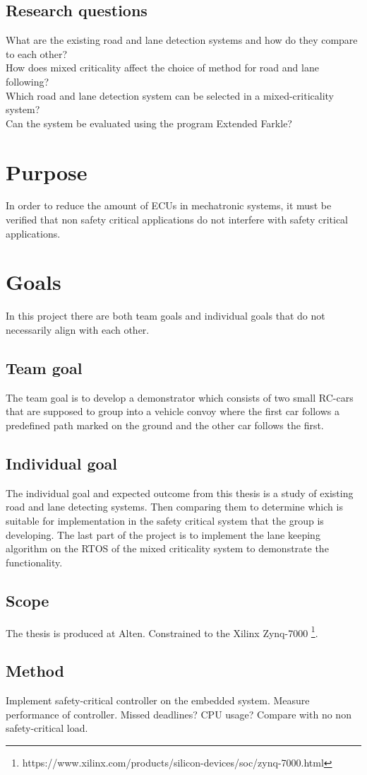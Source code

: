 \subsection{Research questions}
What are the existing road and lane detection systems and how do they compare to each other?\\

How does mixed criticality affect the choice of method for road and lane following?\\

Which road and lane detection system can be selected in a mixed-criticality system?\\

Can the system be evaluated using the program Extended Farkle?

\section{Purpose}
In order to reduce the amount of ECUs in mechatronic systems, it must be verified that non safety critical applications do not interfere with safety critical applications.

\section{Goals}
In this project there are both team goals and individual goals that do not necessarily align with each other.

\subsection{Team goal}
The team goal is to develop a demonstrator which consists of two small RC-cars that are supposed to group into a vehicle convoy where the first car follows a predefined path marked on the ground and the other car follows the first.

\subsection{Individual goal}
The individual goal and expected outcome from this thesis is a study of existing road and lane detecting systems. Then comparing them to determine which is suitable for implementation in the safety critical system that the group is developing. The last part of the project is to implement the lane keeping algorithm on the RTOS of the mixed criticality system to demonstrate the functionality.

\subsection{Scope}
The thesis is produced at Alten.
Constrained to the Xilinx Zynq-7000 \footnote{https://www.xilinx.com/products/silicon-devices/soc/zynq-7000.html}.

\subsection{Method}
Implement safety-critical controller on the embedded system. Measure performance of controller. Missed deadlines? CPU usage? Compare with no non safety-critical load.